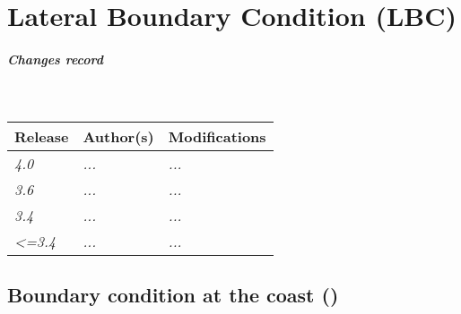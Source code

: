 \documentclass[../main/NEMO_manual]{subfiles}
\begin{document}
\chapter{Lateral Boundary Condition (LBC)}
\label{chap:LBC}

\thispagestyle{plain}

\chaptertoc

\paragraph{Changes record} ~\\

{\footnotesize
  \begin{tabularx}{\textwidth}{l||X|X}
    Release & Author(s) & Modifications \\
    \hline
    {\em   4.0} & {\em ...} & {\em ...} \\
    {\em   3.6} & {\em ...} & {\em ...} \\
    {\em   3.4} & {\em ...} & {\em ...} \\
    {\em <=3.4} & {\em ...} & {\em ...}
  \end{tabularx}
}

\clearpage


\section[Boundary condition at the coast (\forcode{rn_shlat})]{Boundary condition at the coast (\protect{})}
\label{sec:LBC_coast}

\begin{listing}
  \caption{}
  \label{lst:namlbc}
\end{listing}


\end{document}
